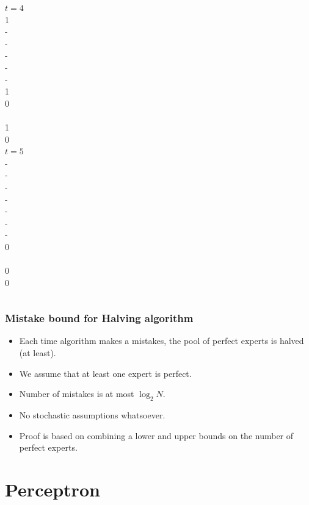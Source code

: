 \documentclass{beamer}
\begin{document}
\begin{frame}
\begin{columns}
\column[t]{1cm}	    		     
 $t=4$ \\ 1 \\ - \\ -  \\ - \\ - \\ - \\ 1  \\ 0 \\ ~ \\
\color<14>{red} 1 \\
 0 \\
		    			     
\column[t]{1cm}	    		     
 $t=5$ \\ - \\ - \\ -  \\ - \\ - \\ - \\ -  \\ 0 \\ ~ \\
\color<17>{red} 0 \\
 0 \\

\end{columns} 
\end{frame} 

\begin{frame}
\frametitle{Mistake bound for Halving algorithm}
\begin{itemize}
\item 
Each time algorithm makes a mistakes, the pool of perfect experts is halved (at least).
\item
We assume that at least one expert is perfect.
\item
Number of mistakes is at most $\log_2 N$.
\item
No stochastic assumptions whatsoever.
\item
Proof is based on combining a lower and upper bounds on the number of perfect experts.
\end{itemize}
\end{frame}


\section{Perceptron}
\end{document}
